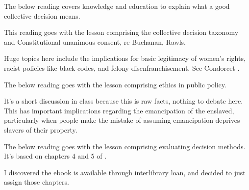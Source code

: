


\appendix





\begin{boxcomment}
    The below reading covers knowledge and education to explain what a good collective decision means.
\end{boxcomment}


\begin{boxcomment}
    This reading goes with the lesson comprising the collective decision taxonomy and Constitutional unanimous consent, re Buchanan, Rawls.

    Huge topics here include the implications for basic legitimacy of women's rights, racist policies like black codes, and felony disenfranchisement.  See Condorcet \autocite{Condorcet1789}.
\end{boxcomment}


\begin{boxcomment}
    The below reading goes with the lesson comprising ethics in public policy.

    It's a short discussion in class because this is raw facts, nothing to debate here.  This has important implications regarding the emancipation of the enslaved, particularly when people make the mistake of assuming emancipation deprives slavers of their property.
\end{boxcomment}


\begin{boxcomment}
    The below reading goes with the lesson comprising evaluating decision methods.  It's based on chapters 4 and 5 of \autocite{Tideman2006}.

    I discovered the ebook is available through interlibrary loan, and decided to just assign those chapters.
\end{boxcomment}


